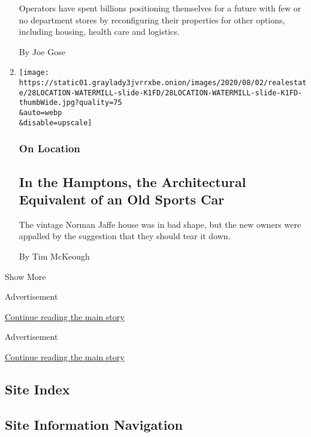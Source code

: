 \begin{enumerate}
  Operators have spent billions positioning themselves for a future with
  few or no department stores by reconfiguring their properties for
  other options, including housing, health care and logistics.

  By Joe Gose
\item
  \href{/2020/07/28/realestate/in-the-hamptons-the-architectural-equivalent-of-an-old-sports-car.html}{}

  \texttt{[image: https://static01.graylady3jvrrxbe.onion/images/2020/08/02/realestate/28LOCATION-WATERMILL-slide-K1FD/28LOCATION-WATERMILL-slide-K1FD-thumbWide.jpg?quality=75\\\&auto=webp\\\&disable=upscale]}

  \hypertarget{on-location}{%
  \subsubsection{On Location}\label{on-location}}

  \hypertarget{in-the-hamptons-the-architectural-equivalent-of-an-old-sports-car}{%
  \subsection{In the Hamptons, the Architectural Equivalent of an Old
  Sports
  Car}\label{in-the-hamptons-the-architectural-equivalent-of-an-old-sports-car}}

  The vintage Norman Jaffe house was in bad shape, but the new owners
  were appalled by the suggestion that they should tear it down.

  By Tim McKeough
\end{enumerate}

Show More

Advertisement

\protect\hyperlink{after-mid3}{Continue reading the main story}

Advertisement

\protect\hyperlink{after-mktg}{Continue reading the main story}

\hypertarget{site-index}{%
\subsection{Site Index}\label{site-index}}

\hypertarget{site-information-navigation}{%
\subsection{Site Information
Navigation}\label{site-information-navigation}}

